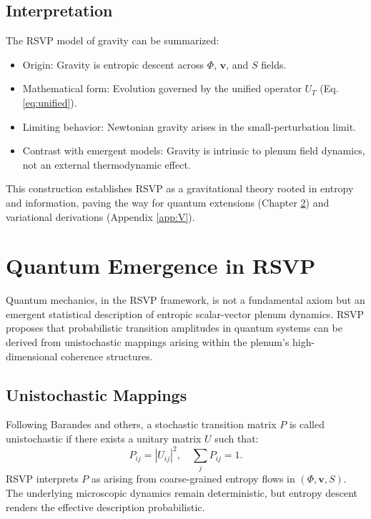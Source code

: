 \documentclass[12pt]{report}
\begin{document}
\section{Interpretation}
The RSVP model of gravity can be summarized:
\begin{itemize}
    \item Origin: Gravity is entropic descent across \(\Phi\), \(\mathbf{v}\), and \(S\) fields.
    \item Mathematical form: Evolution governed by the unified operator \(U_T\) (Eq. \eqref{eq:unified}).
    \item Limiting behavior: Newtonian gravity arises in the small-perturbation limit.
    \item Contrast with emergent models: Gravity is intrinsic to plenum field dynamics, not an external thermodynamic effect.
\end{itemize}
This construction establishes RSVP as a gravitational theory rooted in entropy and information, paving the way for quantum extensions (Chapter \ref{chap:quantum-emergence}) and variational derivations (Appendix \ref{app:V}).

\chapter{Quantum Emergence in RSVP}
\label{chap:quantum-emergence}
Quantum mechanics, in the RSVP framework, is not a fundamental axiom but an emergent statistical description of entropic scalar-vector plenum dynamics. RSVP proposes that probabilistic transition amplitudes in quantum systems can be derived from unistochastic mappings arising within the plenum’s high-dimensional coherence structures.

\section{Unistochastic Mappings}
Following Barandes and others, a stochastic transition matrix \(P\) is called unistochastic if there exists a unitary matrix \(U\) such that:
\begin{equation}
P_{ij} = |U_{ij}|^2, \quad \sum_j P_{ij} = 1. \label{eq:unistochastic}
\end{equation}
RSVP interprets \(P\) as arising from coarse-grained entropy flows in \((\Phi, \mathbf{v}, S)\). The underlying microscopic dynamics remain deterministic, but entropy descent renders the effective description probabilistic.
\end{document}
